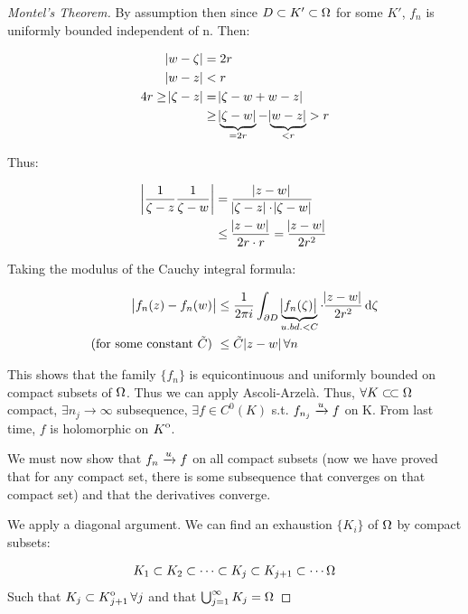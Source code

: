\begin{proof}[Montel's Theorem]
By assumption then since $D\subset K' \subset \Omega$ for some $K'$, $f_n$ is uniformly bounded independent of n. Then:

\begin{align*}
    \abs{w-\zeta} &= 2r\\
    \abs{w-z} &< r\\
    4r \geq \abs{\zeta - z} &= \abs{\zeta - w + w -z}\\
    &\geq  \underbrace{\abs{\zeta - w}}_{=2r} - \underbrace{\abs{w-z}}_{<r} > r\\
\end{align*}

Thus:

\begin{align*}
    \abs{\frac{1}{\zeta - z} \frac{1}{\zeta - w}} &= \frac{\abs{z-w}}{\abs{\zeta-z} \cdot \abs{\zeta-w}}\\
    &\leq \frac{\abs{z-w}}{2r\cdot r} = \frac{\abs{z-w}}{2r^2}
\end{align*}

Taking the modulus of the Cauchy integral formula:

\begin{align*}
    \abs{f_n(z) - f_n(w)} &\leq \frac{1}{2 \pi i} \int_{\partial D} \underbrace{\abs{f_n(\zeta) }}_{u.bd. <C} \cdot \frac{\abs{z-w}}{2r^2} \dif \zeta\\
    \text{(for some constant $\Tilde{C}$) }& \leq \Tilde{C} \abs{z-w} \forall n
\end{align*}

This shows that the family $\{ f_n \} $ is equicontinuous and uniformly bounded on compact subsets of $\Omega$. Thus we can apply Ascoli-Arzelà. Thus, $\forall K \ssubset \om$ compact, $\exists n_j \to \infty$ subsequence, $\exists f \in C^0 (K) $ s.t. $f_{n_j} \xrightarrow[]{u} f$ on K. From last time, $f$ is holomorphic on ${\kern0ptK}^{\mathrm{o}}$.

We must now show that $f_n \xrightarrow[]{u} f$ on all compact subsets (now we have proved that for any compact set, there is some subsequence that converges on that compact set) and that the derivatives converge.

We apply a diagonal argument. We can find an exhaustion $\{ K_i \}$ of $\Omega$ by compact subsets:

\begin{align*}
    K_1 \subset K_2 \subset \cdots \subset K_j \subset K_{j+1} \subset \cdots \Omega\\
\end{align*}
Such that $K_j \subset {\kern0ptK}^{\mathrm{o}}_{j+1} \, \forall j$ and that $\bigcup_{j=1}^\infty K_j = \Omega$




\end{proof}
